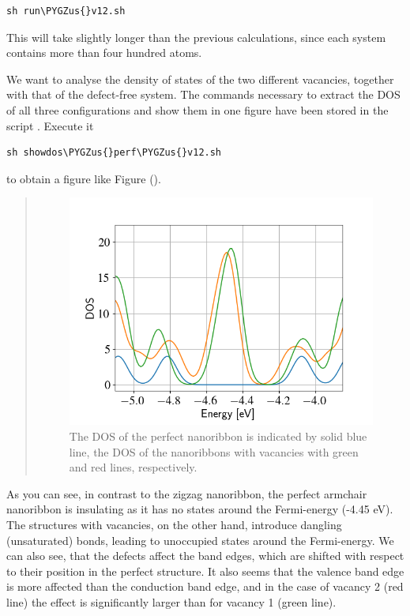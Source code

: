 \documentclass[a4paper,11pt,english]{sphinxmanual}
\def\PYGZus{\char`\_}
\begin{document}
{{\begin{Verbatim}[commandchars=\\\{\}]
sh run\PYGZus{}v12.sh
\end{Verbatim}

This will take slightly longer than the previous calculations, since
each system contains more than four hundred atoms.

We want to analyse the density of states of the two different
vacancies, together with that of the defect-free system. The commands
necessary to extract the DOS of all three configurations and show them
in one figure have been stored in the script
. Execute it

\begin{Verbatim}[commandchars=\\\{\}]
sh showdos\PYGZus{}perf\PYGZus{}v12.sh
\end{Verbatim}

to obtain a figure like Figure {\hyperref[electstruct:fig-armchair-dos]{\emph{}}} ().
\begin{quote}
\begin{figure}[htbp]
\centering
\capstart
\includegraphics[width=0.700\linewidth]{armchair-dos.png}
\caption{The DOS of the perfect nanoribbon is indicated by solid blue
line, the DOS of the nanoribbons with vacancies with green and
red lines, respectively.}\label{electstruct:fig-armchair-dos}\end{figure}
\end{quote}

As you can see, in contrast to the zigzag nanoribbon, the perfect
armchair nanoribbon is insulating as it has no states around the
Fermi-energy (-4.45 eV).  The structures with vacancies, on the other
hand, introduce dangling (unsaturated) bonds, leading to unoccupied
states around the Fermi-energy. We can also see, that the defects
affect the band edges, which are shifted with respect to their
position in the perfect structure. It also seems that the valence band
edge is more affected than the conduction band edge, and in the case
of vacancy 2 (red line) the effect is significantly larger than for
vacancy 1 (green line).


}}
\end{document}
